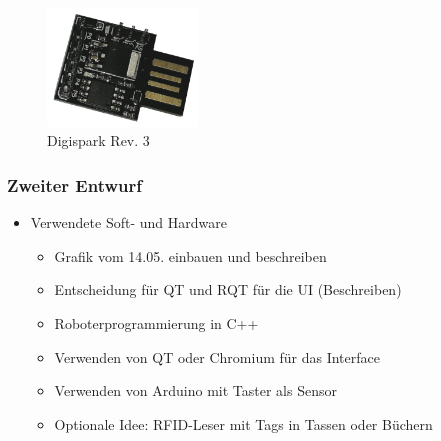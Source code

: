 \documentclass[a4paper,12pt,headsepline]{scrartcl}
\begin{document}
\begin{figure}[H]
\centering
\includegraphics[width=4cm]{Images/digispark.png}
\caption{Digispark Rev. 3}
\label{fig:digispark}
\end{figure}

\subsubsection{Zweiter Entwurf}

		\begin{itemize}
			
			\item Verwendete Soft- und Hardware
			\begin{itemize}
			\item Grafik vom 14.05. einbauen und beschreiben 
			\item Entscheidung für QT und RQT für die UI (Beschreiben)
				\item Roboterprogrammierung in C++
				\item Verwenden von QT oder Chromium für das Interface
				\item Verwenden von Arduino mit Taster als Sensor
				\item Optionale Idee: RFID-Leser mit Tags in Tassen oder Büchern
			\end{itemize}
			
		\end{itemize}
		
		
\end{document}
